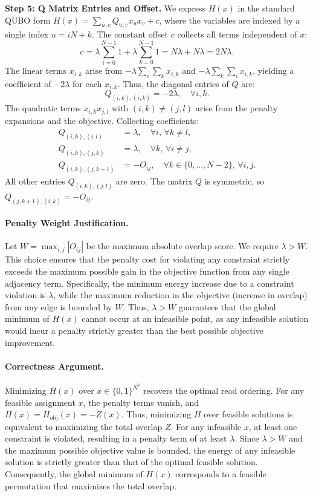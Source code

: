 \documentclass[12pt]{article}
\begin{document}
\textbf{Step 5: Q Matrix Entries and Offset.}
We express $H(x)$ in the standard QUBO form $H(x) = \sum_{u,v} Q_{u,v} x_u x_v + c$, where the variables are indexed by a single index $u = iN+k$. The constant offset $c$ collects all terms independent of $x$:
\begin{equation}
    c = \lambda \sum_{i=0}^{N-1} 1 + \lambda \sum_{k=0}^{N-1} 1 = N\lambda + N\lambda = 2N\lambda.
\end{equation}
The linear terms $x_{i,k}$ arise from $-\lambda \sum_i \sum_k x_{i,k}$ and $-\lambda \sum_k \sum_i x_{i,k}$, yielding a coefficient of $-2\lambda$ for each $x_{i,k}$. Thus, the diagonal entries of $Q$ are:
\begin{equation}
    Q_{(i,k),(i,k)} = -2\lambda, \quad \forall i,k.
\end{equation}
The quadratic terms $x_{i,k} x_{j,l}$ with $(i,k) \neq (j,l)$ arise from the penalty expansions and the objective. Collecting coefficients:
\begin{align}
    Q_{(i,k),(i,l)} &= \lambda, \quad \forall i, \, \forall k \neq l, \\
    Q_{(i,k),(j,k)} &= \lambda, \quad \forall k, \, \forall i \neq j, \\
    Q_{(i,k),(j,k+1)} &= -O_{ij}, \quad \forall k \in \{0, \dots, N-2\}, \, \forall i,j.
\end{align}
All other entries $Q_{(i,k),(j,l)}$ are zero. The matrix $Q$ is symmetric, so $Q_{(j,k+1),(i,k)} = -O_{ij}$.

\paragraph{Penalty Weight Justification.}
Let $W = \max_{i,j} |O_{ij}|$ be the maximum absolute overlap score. We require $\lambda > W$. This choice ensures that the penalty cost for violating any constraint strictly exceeds the maximum possible gain in the objective function from any single adjacency term. Specifically, the minimum energy increase due to a constraint violation is $\lambda$, while the maximum reduction in the objective (increase in overlap) from any edge is bounded by $W$. Thus, $\lambda > W$ guarantees that the global minimum of $H(x)$ cannot occur at an infeasible point, as any infeasible solution would incur a penalty strictly greater than the best possible objective improvement.

\paragraph{Correctness Argument.}
Minimizing $H(x)$ over $x \in \{0,1\}^{N^2}$ recovers the optimal read ordering. For any feasible assignment $x$, the penalty terms vanish, and $H(x) = H_{\text{obj}}(x) = -Z(x)$. Thus, minimizing $H$ over feasible solutions is equivalent to maximizing the total overlap $Z$. For any infeasible $x$, at least one constraint is violated, resulting in a penalty term of at least $\lambda$. Since $\lambda > W$ and the maximum possible objective value is bounded, the energy of any infeasible solution is strictly greater than that of the optimal feasible solution. Consequently, the global minimum of $H(x)$ corresponds to a feasible permutation that maximizes the total overlap.
\end{document}
